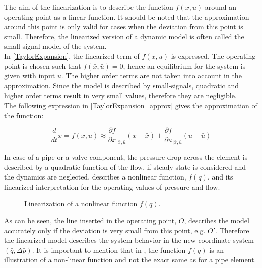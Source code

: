 The aim of the linearization is to describe the function $f(x,u)$ around an operating point as a linear function. It should be noted that the approximation around this point is only valid for cases when the deviation from this point is small. Therefore, the linearized version of a dynamic model is often called the small-signal model of the system. 
\\
In \eqref{TaylorExpansion}, the linearized term of $f(x,u)$ is expressed. The operating point is chosen such that $f(\bar{x},\bar{u}) = 0$,  hence an equilibrium for the system is given with input $\bar{u}$. The higher order terms are not taken into account in the approximation. Since the model is described by small-signals, quadratic and higher order terms result in very small values, therefore they are negligible. 
\\
The following expression in \eqref{TaylorExpansion_approx} gives the approximation of the function: 

\begin{equation}
\frac{d}{dt} x = f(x,u) \approx \frac{\partial f}{\partial x}_{|\bar{x}, \bar{u}} (x-\bar{x}) + \frac{\partial f}{\partial u}_{|\bar{x}, \bar{u}} (u-\bar{u}) 
 \label{TaylorExpansion_approx}
\end{equation}

In case of a pipe or a valve component, the pressure drop across the element is described by a quadratic function of the flow, if steady state is considered and the dynamics are neglected.  describes a nonlinear function, $f(q)$, and its linearized interpretation for the operating values of pressure and flow. 

\begin{figure}[H]
\centering
 
\caption{Linearization of a nonlinear function $f(q).$}
\label{fig:linearization}
\end{figure}

As can be seen, the line inserted in the operating point, $O$, describes the model accurately only if the deviation is very small from this point, e.g. $O'$. Therefore the linearized model describes the system behavior in the new coordinate system $(\bar{q},\Delta \bar{p})$. It is important to mention that in , the function $f(q)$ is an illustration of a non-linear function and not the exact same as for a pipe element. 

